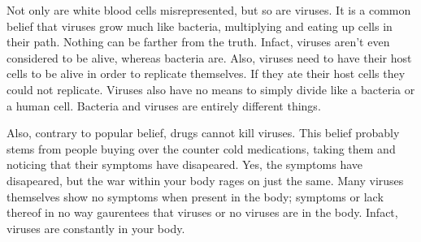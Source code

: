 \documentclass[12pt ]{report}
\begin{document}
Not only are white blood cells misrepresented, but so are viruses.  It is a common belief that viruses grow much like bacteria, multiplying and eating up cells in their path.  Nothing can be farther from the truth.  Infact, viruses aren't even considered to be alive, whereas bacteria are.  Also, viruses need to have their host cells to be alive in order to replicate themselves.  If they ate their host cells they could not replicate.  Viruses also have no means to simply divide like a bacteria or a human cell.  Bacteria and viruses are entirely different things.

Also, contrary to popular belief, drugs cannot kill viruses.  This belief probably stems from people buying over the counter cold medications, taking them and noticing that their symptoms have disapeared.  Yes, the symptoms have disapeared, but the war within your body rages on just the same.  Many viruses themselves show no symptoms when present in the body; symptoms or lack thereof in no way gaurentees that viruses or no viruses are in the body.  Infact, viruses are constantly in your body.
\end{document}
